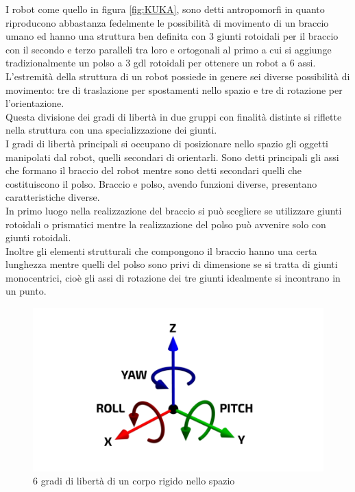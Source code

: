 \documentclass[%
corpo=11pt,
twoside,
 stile=classica,
oldstyle,
greek,%
]{toptesi}
\begin{document}
	 I robot come quello in figura \ref{fig:KUKA}, sono detti antropomorfi in quanto riproducono abbastanza fedelmente le possibilità di movimento di un braccio umano ed hanno una struttura ben definita con 3 giunti rotoidali per il braccio con il secondo e terzo paralleli tra loro e ortogonali al primo a cui si aggiunge tradizionalmente un polso a 3 gdl rotoidali per ottenere un robot a 6 assi.\\ 
	 
	 L'estremità della struttura di un robot possiede in genere sei diverse possibilità di movimento: tre di traslazione per spostamenti nello spazio e tre di rotazione per l'orientazione.\\
	 Questa divisione dei gradi di libertà in due gruppi con finalità distinte si riflette nella struttura con una specializzazione dei giunti. \\
	 I gradi di libertà principali si occupano di posizionare nello spazio gli oggetti manipolati dal robot, quelli secondari di orientarli. Sono detti principali gli assi che formano il braccio del robot mentre sono detti secondari quelli che costituiscono il polso. Braccio e polso, avendo funzioni diverse, presentano caratteristiche diverse. \\
	 In primo luogo nella realizzazione del braccio si può scegliere se utilizzare giunti rotoidali o prismatici mentre la realizzazione del polso può avvenire solo con giunti rotoidali. \\
	 Inoltre gli elementi strutturali che compongono il braccio hanno una certa lunghezza mentre quelli del polso sono privi di dimensione se si tratta di giunti monocentrici, cioè gli assi di rotazione dei tre giunti idealmente si incontrano in un punto. \\
	 \begin{figure} [H]
	 	\centering
	 	\includegraphics[width=\textwidth]{pictures/6DOF.png}
	 	\caption{6 gradi di libertà di un corpo rigido nello spazio}
	 	\label{fig:6DOF}
	 \end{figure}
\end{document}
